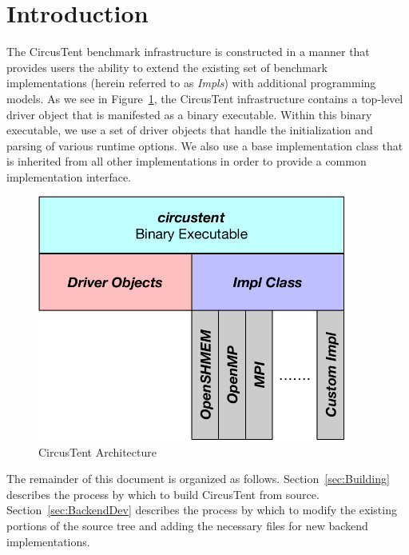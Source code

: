 \documentclass{article}
\begin{document}
\clearpage
\section{Introduction}
\label{sec:Introduction}

The CircusTent benchmark infrastructure is constructed in a manner that provides
users the ability to extend the existing set of benchmark implementations (herein 
referred to as \textit{Impls}) with additional programming models.  As we see in Figure~\ref{fig:Arch}, 
the CircusTent infrastructure contains a top-level driver object that is manifested as a 
binary executable.  Within this binary executable, we use a set of driver objects that handle 
the initialization and parsing of various runtime options.  We also use a base implementation 
class that is inherited from all other implementations in order to provide a common implementation 
interface.  

\begin{figure}[h]
\begin{center}
\includegraphics[width=4in]{figures/Arch.pdf}
\vspace*{8pt}
\caption{CircusTent Architecture}
\label{fig:Arch}
\end{center}
\end{figure}

The remainder of this document is organized as follows.  Section~\ref{sec:Building} 
describes the process by which to build CircusTent from source.  Section~\ref{sec:BackendDev} 
describes the process by which to modify the existing portions of the source tree and adding 
the necessary files for new backend implementations.  
\end{document}
